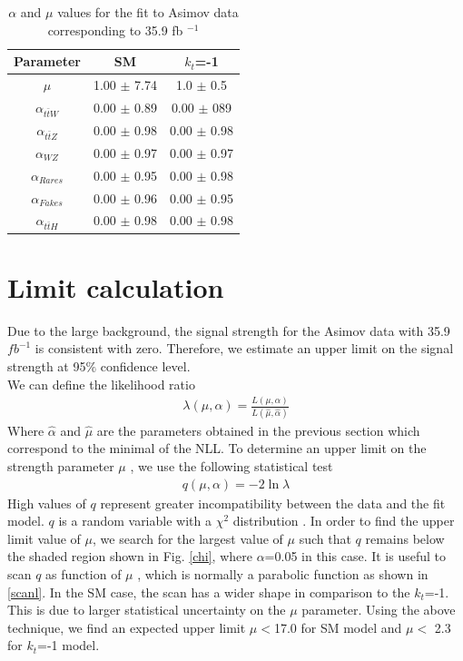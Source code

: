 \begin{linenumbers}
	\begin{table}[ht!]
		\small
		\centering
		\caption{$\alpha$ and $\mu$ values  for the fit to Asimov data corresponding to 35.9 fb $^{-1}$}
		\begin{tabular}{ccc}
			\hline
			Parameter  & SM &$k_t$=-1\\
			\hline
			$\mu$   & 1.00 $\pm$  7.74& 1.0 $\pm$  0.5\\
			$\alpha_{t\bar{t}W}$&  0.00 $\pm$  0.89&  0.00 $\pm$  089\\
			$\alpha_{t\bar{t}Z}$ &  0.00 $\pm$  0.98& 0.00 $\pm$  0.98\\
			$\alpha_{WZ}$   & 0.00 $\pm$  0.97& 0.00 $\pm$  0.97\\
			$\alpha_{Rares}$   &0.00 $\pm$  0.95&0.00 $\pm$  0.98 \\
			$\alpha_{Fakes}$ &   0.00 $\pm$  0.96& 0.00 $\pm$  0.95\\
			$\alpha_{t\bar{t}H}$ &0.00 $\pm$  0.98& 0.00 $\pm$ 0.98\\
		\end{tabular}
		\label{parameters}
	\end{table}
	
	\pagebreak
	\section{Limit calculation}
	Due to the large background, the signal strength for the Asimov data with 35.9 $fb^{-1}$ is consistent with zero.
	Therefore, we estimate an upper limit on the signal strength at 95$\%$  confidence level.\\
	
	We can define the likelihood ratio
	\begin{align}
		\lambda(\mu,\alpha)=\frac{L(\mu,\alpha)}{L(\hat{\mu},\hat{\alpha})}
	\end{align}
	Where $\hat{\alpha}$ and $\hat{\mu}$ are the parameters obtained in the previous section which correspond to the minimal of the NLL.
	To determine an upper limit on the strength parameter $\mu$ , we use the following statistical test
	\begin{align}
		q(\mu,\alpha)= -2\ln{\lambda} 
	\end{align}
	High values of $q$ represent greater incompatibility between the data and the fit model.
	$q$ is a random variable with a $\chi^2$ distribution \cite{asimov}.
	In order to find the upper limit value of $\mu$, we search for the largest value of $\mu$  such that $q$ remains below the shaded region shown in Fig. \ref{chi}, where $\alpha$=0.05 in this case. 
	It is useful to scan $q$ as function of $\mu$ , which is normally a parabolic function as shown in \ref{scanl}. In the SM case, the scan has a wider shape in comparison to the $k_t$=-1. This is due to larger statistical uncertainty on the $\mu$ parameter. 
	Using the above technique, we find an expected upper limit $\mu < $17.0 for SM model and $\mu < $ 2.3 for $k_t$=-1 model. 
	

\end{linenumbers}
